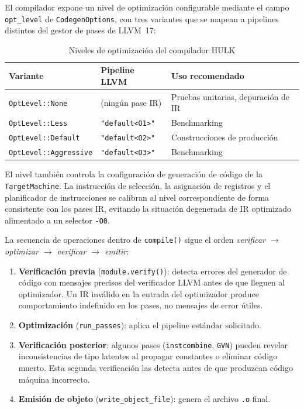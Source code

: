 \documentclass[12pt, a4paper]{article}
\begin{document}
El compilador expone un nivel de optimización configurable mediante el campo
\texttt{opt\_level} de \texttt{CodegenOptions}, con tres variantes que se mapean
a pipelines distintos del gestor de pases de LLVM~17:

\begin{table}[h!]
\centering
\caption{Niveles de optimización del compilador HULK}
\label{tab:opt-levels}
\begin{tabularx}{\textwidth}{@{}llX@{}}
\toprule
\textbf{Variante} & \textbf{Pipeline LLVM} & \textbf{Uso recomendado} \\
\midrule
\texttt{OptLevel::None} & (ningún pase IR) & Pruebas unitarias, depuración de IR \\
\texttt{OptLevel::Less} & \texttt{"default<O1>"} & Benchmarking \\
\texttt{OptLevel::Default} & \texttt{"default<O2>"} & Construcciones de producción \\
\texttt{OptLevel::Aggressive} & \texttt{"default<O3>"} & Benchmarking \\
\bottomrule
\end{tabularx}
\end{table}

El nivel también controla la configuración de generación de código de la
\texttt{TargetMachine}. La instrucción de selección, la asignación de registros
y el planificador de instrucciones se calibran al nivel correspondiente de forma
consistente con los pases IR, evitando la situación degenerada de IR optimizado
alimentado a un selector \texttt{-O0}.

La secuencia de operaciones dentro de \texttt{compile()} sigue el orden
\textit{verificar $\to$ optimizar $\to$ verificar $\to$ emitir}:

\begin{enumerate}[leftmargin=*, label=\arabic*.]
  \item \textbf{Verificación previa} (\texttt{module.verify()}): detecta errores
        del generador de código con mensajes precisos del verificador LLVM antes
        de que lleguen al optimizador. Un IR inválido en la entrada del optimizador
        produce comportamiento indefinido en los pases, no mensajes de error
        útiles.
  \item \textbf{Optimización} (\texttt{run\_passes}): aplica el pipeline estándar solicitado.
  \item \textbf{Verificación posterior}: algunos pases (\texttt{instcombine},
        \texttt{GVN}) pueden revelar inconsistencias de tipo latentes al propagar
        constantes o eliminar código muerto. Esta segunda verificación las
        detecta antes de que produzcan código máquina incorrecto.
  \item \textbf{Emisión de objeto} (\texttt{write\_object\_file}): genera el
        archivo \texttt{.o} final.
\end{enumerate}
\end{document}
